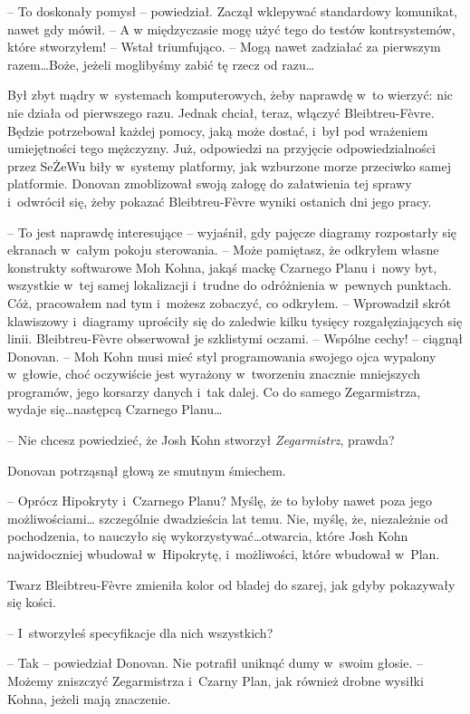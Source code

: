 \documentclass[oneside,polish,11pt,sfheadings]{mwbk}
\begin{document}
-- To doskonały pomysł -- powiedział. Zaczął wklepywać standardowy komunikat, nawet gdy mówił. -- A
w międzyczasie mogę użyć tego do testów kontrsystemów, które stworzyłem!
-- Wstał triumfująco. -- Mogą nawet zadziałać za pierwszym razem\ldots Boże,
jeżeli moglibyśmy zabić tę rzecz od razu\ldots

Był zbyt mądry w~systemach komputerowych, żeby naprawdę w~to wierzyć:
nic nie działa od pierwszego razu. Jednak chciał, teraz, włączyć
Bleibtreu-Fèvre. Będzie potrzebował każdej pomocy, jaką może dostać, i~był pod wrażeniem umiejętności tego mężczyzny. Już, odpowiedzi na
przyjęcie odpowiedzialności przez SeŻeWu biły w~systemy platformy, jak
wzburzone morze przeciwko samej platformie. Donovan zmoblizował swoją
załogę do załatwienia tej sprawy i~odwrócił się, żeby pokazać
Bleibtreu-Fèvre wyniki ostanich dni jego pracy.

-- To jest naprawdę interesujące -- wyjaśnił, gdy pajęcze diagramy
rozpostarły się ekranach w~całym pokoju sterowania. -- Może pamiętasz, że
odkryłem własne konstrukty softwarowe Moh Kohna, jakąś mackę Czarnego
Planu i~nowy byt, wszystkie w~tej samej lokalizacji i~trudne do
odróżnienia w~pewnych punktach. Cóż, pracowałem nad tym i~możesz
zobaczyć, co odkryłem. -- Wprowadził skrót klawiszowy i~diagramy
uprościły się do zaledwie kilku tysięcy rozgałęziających się linii.
Bleibtreu-Fèvre obserwował je szklistymi oczami. -- Wspólne cechy! -- ciągnął Donovan. -- Moh Kohn musi mieć styl programowania swojego ojca
wypalony w~głowie, choć oczywiście jest wyrażony w~tworzeniu znacznie
mniejszych programów, jego korsarzy danych i~tak dalej. Co do samego
Zegarmistrza, wydaje się\ldots następcą Czarnego Planu\ldots

-- Nie chcesz powiedzieć, że Josh Kohn stworzył \emph{Zegarmistrz},
prawda?

Donovan potrząsnął głową ze smutnym śmiechem. 

-- Oprócz Hipokryty i~Czarnego Planu? Myślę, że to byłoby nawet poza jego możliwościami\ldots
szczególnie dwadzieścia lat temu. Nie, myślę, że, niezależnie od
pochodzenia, to nauczyło się wykorzystywać\ldots otwarcia, które Josh Kohn
najwidoczniej wbudował w~Hipokrytę, i~możliwości, które wbudował w~Plan.

Twarz Bleibtreu-Fèvre zmieniła kolor od bladej do szarej, jak gdyby
pokazywały się kości.

-- I~stworzyłeś specyfikacje dla nich wszystkich?

-- Tak -- powiedział Donovan. Nie potrafił uniknąć dumy w~swoim głosie. -- Możemy zniszczyć Zegarmistrza i~Czarny Plan, jak również drobne wysiłki
Kohna, jeżeli mają znaczenie.
\end{document}
